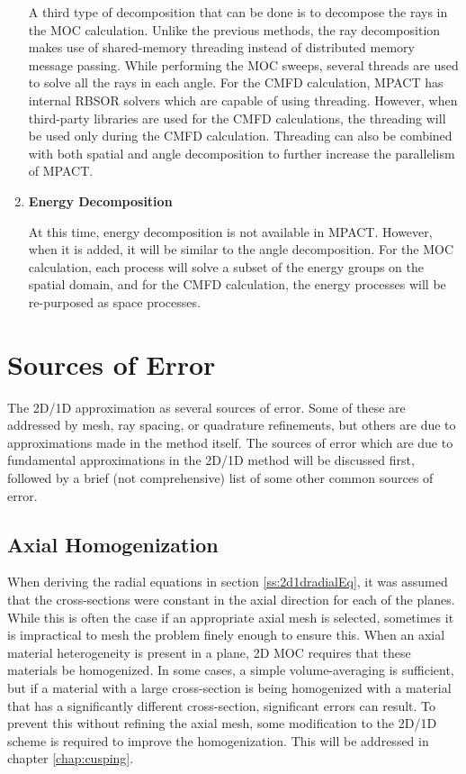 \begin{enumerate}[leftmargin=*]
A third type of decomposition that can be done is to decompose the rays in the MOC calculation.  Unlike the previous methods, the ray decomposition makes use of shared-memory threading instead of distributed memory message passing.  While performing the MOC sweeps, several threads are used to solve all the rays in each angle.  For the CMFD calculation, MPACT has internal RBSOR solvers which are capable of using threading.  However, when third-party libraries are used for the CMFD calculations, the threading will be used only during the CMFD calculation.  Threading can also be combined with both spatial and angle decomposition to further increase the parallelism of MPACT.

\item \textbf{Energy Decomposition}

At this time, energy decomposition is not available in MPACT.  However, when it is added, it will be similar to the angle decomposition.  For the MOC calculation, each process will solve a subset of the energy groups on the spatial domain, and for the CMFD calculation, the energy processes will be re-purposed as space processes.
\end{enumerate}

\section{Sources of Error}\label{s:2d1dErrors}

The 2D/1D approximation as several sources of error.  Some of these are addressed by mesh, ray spacing, or quadrature refinements, but others are due to approximations made in the method itself.  The sources of error which are due to fundamental approximations in the 2D/1D method will be discussed first, followed by a brief (not comprehensive) list of some other common sources of error.

\subsection{Axial Homogenization}

When deriving the radial equations in section \ref{ss:2d1dradialEq}, it was assumed that the cross-sections were constant in the axial direction for each of the planes.  While this is often the case if an appropriate axial mesh is selected, sometimes it is impractical to mesh the problem finely enough to ensure this.  When an axial material heterogeneity is present in a plane, 2D MOC requires that these materials be homogenized.  In some cases, a simple volume-averaging is sufficient, but if a material with a large cross-section is being homogenized with a material that has a significantly different cross-section, significant errors can result.  To prevent this without refining the axial mesh, some modification to the 2D/1D scheme is required to improve the homogenization.  This will be addressed in chapter \ref{chap:cusping}.

